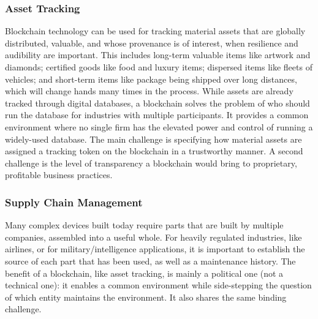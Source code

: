 \subsubsection{Asset Tracking} 
Blockchain technology can be used for tracking material assets that are globally distributed, valuable, and whose provenance is of interest, when resilience and audibility are important. This includes long-term valuable items like artwork and diamonds; certified goods like food and luxury items; dispersed items like fleets of vehicles; and short-term items like package being shipped over long distances, which will change hands many times in the process. While assets are already tracked through digital databases, a blockchain solves the problem of who should run the database for industries with multiple participants. It provides a common environment where no single firm has the elevated power and control of running a widely-used database. The main challenge is specifying how material assets are assigned a tracking token on the blockchain in a trustworthy manner. A second challenge is the level of transparency a blockchain would bring to proprietary, profitable business practices. 


\subsubsection{Supply Chain Management} %
Many complex devices built today require parts that are built by multiple companies, assembled into a useful whole. For heavily regulated industries, like airlines, or for military/intelligence applications, it is important to establish the source of each part that has been used, as well as a maintenance history. The benefit of a blockchain, like asset tracking, is mainly a political one (not a technical one): it enables a common environment while side-stepping the question of which entity maintains the environment. It also shares the same binding challenge.


